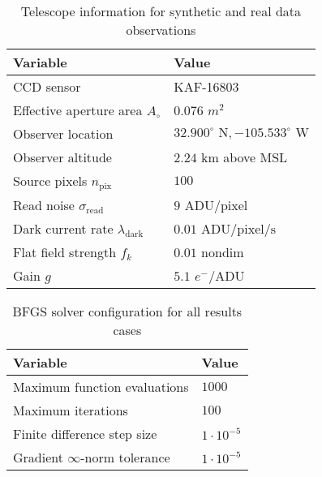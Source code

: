 \documentclass[a4paper,twocolumn]{spaceDebrisC} %
\begin{document}
\begin{table}[H]
  \centering
  \caption{Telescope information for synthetic and real data observations}
  \vspace*{6pt}
  \begin{tabular}{|l|l|}
  \hline
  \textbf{Variable} & \textbf{Value} \\ \hline
 CCD sensor & KAF-16803 \\ \hline
 Effective aperture area $A_\circ$ & $0.076$ $m^2$ \\ \hline
 Observer location & $32.900^\circ \textrm{ N}, -105.533^\circ \textrm{ W}$ \\ \hline
 Observer altitude & $2.24$ km above MSL \\ \hline
 Source pixels $n_\text{pix}$ & $100$ \\ \hline
 Read noise $\sigma_\text{read}$ & $9$ $\text{ADU} / \text{pixel}$ \\ \hline
 Dark current rate $\lambda_\text{dark}$ & $0.01$ $\text{ADU} / \text{pixel} / \text{s}$ \\ \hline
 Flat field strength $f_k$ & $0.01$ nondim \\ \hline
 Gain $g$ & $5.1$ $e^- / \text{ADU}$ \\ \hline
  \end{tabular}
  \label{tb:tele_info}
 \end{table}

 \begin{table}[H]
  \centering
  \caption{BFGS solver configuration for all results cases}
  \vspace*{6pt}
  \begin{tabular}{|l|l|}
  \hline
  \textbf{Variable} & \textbf{Value} \\ \hline
 Maximum function evaluations & $1000$ \\ \hline
 Maximum iterations & $100$ \\ \hline
 Finite difference step size & $1 \cdot 10^{-5}$ \\ \hline
 Gradient $\infty$-norm tolerance & $1 \cdot 10^{-5}$ \\ \hline
  \end{tabular}
  \label{tb:bfgs_info}
 \end{table}


\end{document}
